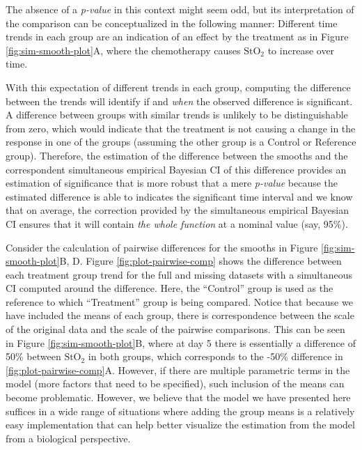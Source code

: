 \documentclass[
]{article}
\begin{document}
The absence of a \emph{p-value} in this context might seem odd, but its interpretation of the comparison can be conceptualized in the following manner: Different time trends in each group are an indication of an effect by the treatment as in Figure \ref{fig:sim-smooth-plot}A, where the chemotherapy causes \(\mbox{StO}_2\) to increase over time.

With this expectation of different trends in each group, computing the difference between the trends will identify if and \emph{when} the observed difference is significant. A difference between groups with similar trends is unlikely to be distinguishable from zero, which would indicate that the treatment is not causing a change in the response in one of the groups (assuming the other group is a Control or Reference group). Therefore, the estimation of the difference between the smooths and the correspondent simultaneous empirical Bayesian CI of this difference provides an estimation of significance that is more robust that a mere \emph{p-value} because the estimated difference is able to indicates the significant time interval and we know that on average, the correction provided by the simultaneous empirical Bayesian CI ensures that it will contain \emph{the whole function} at a nominal value (say, 95\%).

Consider the calculation of pairwise differences for the smooths in Figure \ref{fig:sim-smooth-plot}B, D. Figure \ref{fig:plot-pairwise-comp} shows the difference between each treatment group trend for the full and missing datasets with a simultaneous CI computed around the difference. Here, the ``Control'' group is used as the reference to which ``Treatment'' group is being compared. Notice that because we have included the means of each group, there is correspondence between the scale of the original data and the scale of the pairwise comparisons. This can be seen in Figure \ref{fig:sim-smooth-plot}B, where at day 5 there is essentially a difference of 50\% between \(\mbox{StO}_2\) in both groups, which corresponds to the -50\% difference in \ref{fig:plot-pairwise-comp}A. However, if there are multiple parametric terms in the model (more factors that need to be specified), such inclusion of the means can become problematic. However, we believe that the model we have presented here suffices in a wide range of situations where adding the group means is a relatively easy implementation that can help better visualize the estimation from the model from a biological perspective.
\end{document}
